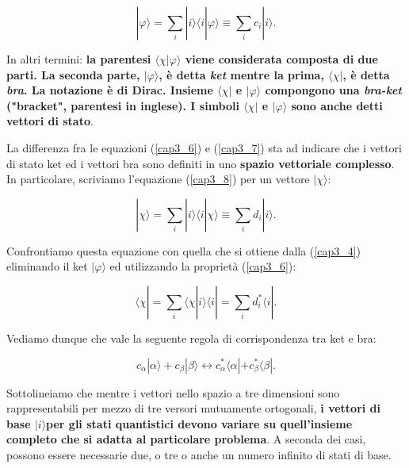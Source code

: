 \documentclass[a4paper,12pt,oneside]{book}
\begin{document}
\begin{equation}
 | \varphi \rangle= \sum \limits_{i} | i \rangle \langle i | \varphi \rangle \equiv \sum \limits_{i} c_i | i \rangle .
\label{cap3_8}
\end{equation}

In altri termini: \textbf{la parentesi $\langle \chi | \varphi \rangle $ viene considerata composta di due parti. La seconda parte, $| \varphi \rangle $, è detta \emph{ket} mentre la prima, $\langle \chi |$, è detta \emph{bra}. La notazione è di Dirac. Insieme $\langle \chi |$ e $| \varphi \rangle$ compongono una \emph{bra-ket} ("bracket", parentesi in inglese). I simboli $\langle \chi |$ e $| \varphi \rangle$ sono anche detti vettori di stato}.

La differenza fra le equazioni (\ref{cap3_6}) e (\ref{cap3_7}) sta ad indicare che i vettori di stato ket ed i vettori bra sono definiti in uno \textbf{spazio vettoriale complesso}. In particolare, scriviamo l'equazione (\ref{cap3_8}) per un vettore $| \chi\rangle$:

\begin{equation}
| \chi \rangle = \sum \limits_{i} | i \rangle \langle i | \chi \rangle \equiv \sum \limits_{i} d_i | i \rangle .
\end{equation}

Confrontiamo questa equazione con quella che si ottiene dalla (\ref{cap3_4}) eliminando il ket $| \varphi \rangle$ ed utilizzando la proprietà (\ref{cap3_6}):

\begin{equation}
\langle \chi | =\sum \limits_{i} \langle \chi | i \rangle \langle i | = \sum \limits_{i} d^*_i \langle i | .
\end{equation}

Vediamo dunque che vale la seguente regola di corrispondenza tra ket e bra:

\begin{equation}
c_{\alpha}| \alpha \rangle +c_{\beta} | \beta \rangle  \leftrightarrow c^*_{\alpha}\langle \alpha | +c^*_{\beta}\langle \beta | .
\end{equation}

Sottolineiamo che mentre i vettori nello spazio a tre dimensioni sono rappresentabili per mezzo di tre versori mutuamente ortogonali, \textbf{i vettori di base $| i \rangle $per gli stati quantistici devono variare su quell'insieme completo che si adatta al particolare problema}. A seconda dei casi, possono essere necessarie due, o tre o anche un numero infinito di stati di base.
\end{document}
